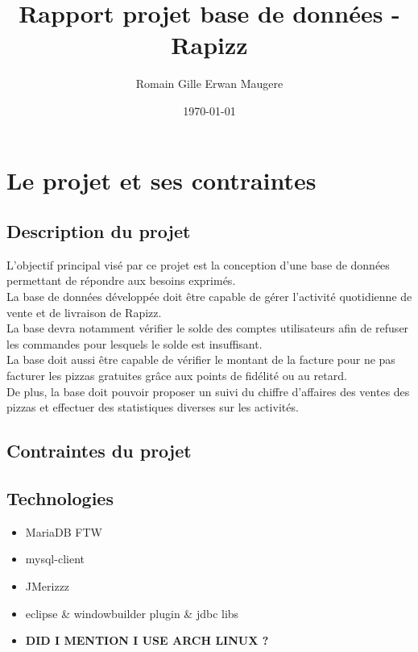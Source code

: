 \documentclass[]{article}
\title{Rapport projet base de données - Rapizz}
\author{Romain Gille Erwan Maugere}
\date{\today}
\providecommand{\tightlist}{%
    \setlength{\itemsep}{0pt}\setlength{\parskip}{0pt}}
\begin{document}
\maketitle

{
    \setcounter{tocdepth}{3}
    \tableofcontents
}
\newpage

\section{Le projet et ses
    contraintes}\label{le-projet-et-ses-contraintes}

\subsection{Description du projet}\label{description-du-projet}

L'objectif principal visé par ce projet est la conception d'une base de
données permettant de répondre aux besoins exprimés.\\
La base de données développée doit être capable de gérer l'activité
quotidienne de vente et de livraison de Rapizz.\\
La base devra notamment vérifier le solde des comptes utilisateurs
afin de refuser les commandes pour lesquels le solde est insuffisant.\\
La base doit aussi être capable de vérifier le montant de la facture
pour ne pas facturer les pizzas gratuites grâce aux points de fidélité
ou au retard.\\
De plus, la base doit pouvoir proposer un suivi du chiffre d'affaires
des ventes des pizzas et effectuer des statistiques diverses sur les
activités.

\subsection{Contraintes du projet}\label{contraintes-du-projet}

\subsection{Technologies}\label{technologies}

\begin{itemize}
        \tightlist
    \item
        MariaDB FTW
    \item
        mysql-client
    \item
        JMerizzz
    \item
        eclipse \& windowbuilder plugin \& jdbc libs
    \item
        \textbf{DID I MENTION I USE ARCH LINUX ?}
\end{itemize}
\end{document}
